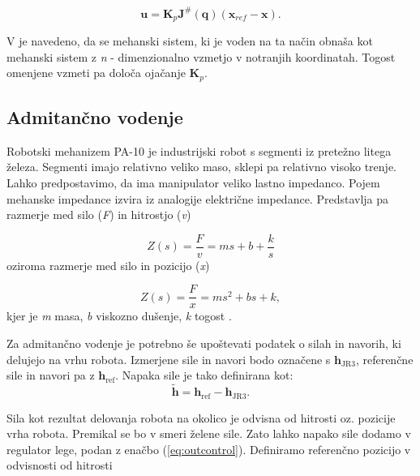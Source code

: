 \documentclass[a4paper]{article}
\begin{document}
\begin{equation} \label{eq:outcontrol}
\textbf{u} = \textbf{K}_p  \textbf{J}^{\#}(\textbf{q})  (\textbf{x}_{ref} - \textbf{x}).
\end{equation}

V \cite{mihelj_vodenje} je navedeno, da se mehanski sistem, ki je voden na ta način obnaša kot mehanski sistem z \textit{n} - dimenzionalno vzmetjo v notranjih koordinatah. Togost omenjene vzmeti pa določa ojačanje $\textbf{K}_p$.


\subsection{Admitančno vodenje} \label{sec:vodenje-admitance}

Robotski mehanizem PA-10 je industrijski robot s segmenti iz pretežno litega železa. Segmenti imajo relativno veliko maso, sklepi pa relativno visoko trenje. Lahko predpostavimo, da ima manipulator veliko lastno impedanco. Pojem mehanske impedance izvira iz analogije električne impedance. Predstavlja pa razmerje med silo (\textit{F}) in hitrostjo (\textit{v}) 

\begin{equation}
Z(s) = \frac{F}{v} = ms + b + \frac{k}{s}
\end{equation}
oziroma razmerje med silo in pozicijo (\textit{x})

\begin{equation}
Z(s) = \frac{F}{x} = ms^2 + bs + k,
\end{equation}
kjer je \textit{m} masa, \textit{b} viskozno dušenje, \textit{k} togost \cite{mihelj_hapt}.



Za admitančno vodenje je potrebno še upoštevati podatek o silah in navorih, ki delujejo na vrhu robota. Izmerjene sile in navori bodo označene s $\textbf{h}_{\mathrm{JR3}}$, referenčne sile in navori pa z $\textbf{h}_{\mathrm{ref}}$. Napaka sile je tako definirana kot:
\begin{equation} \label{eq:herr}
\tilde{\textbf{h}} = \textbf{h}_{\mathrm{ref}} - \textbf{h}_{\mathrm{JR3}}.
\end{equation}

Sila kot rezultat delovanja robota na okolico je odvisna od hitrosti oz. pozicije vrha robota. Premikal se bo v smeri želene sile. Zato lahko napako sile dodamo v regulator lege, podan z enačbo (\ref{eq:outcontrol}). Definiramo referenčno pozicijo v odvisnosti od hitrosti
\end{document}
